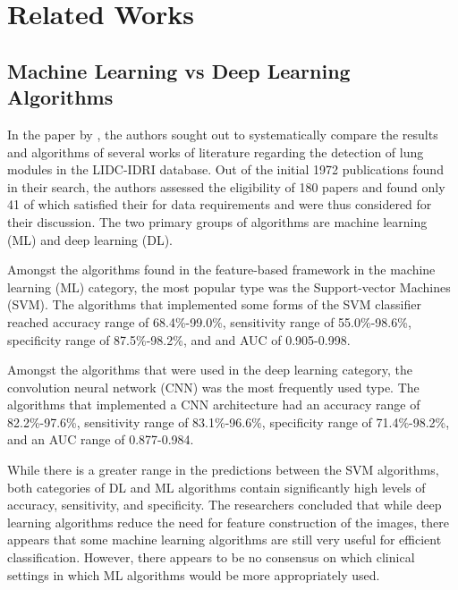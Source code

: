 \documentclass[10pt,twocolumn,letterpaper]{article}
\begin{document}

\section{Related Works} \label{sec:related}

   \subsection{Machine Learning vs Deep Learning Algorithms} \label{sec:related-dl-vs-ml}
      In the paper by \cite{ml_vs_dl}, the authors sought out to systematically compare the results and algorithms of
      several works of literature regarding the detection of lung modules in the LIDC-IDRI database.
      Out of the initial 1972 publications found in their search, the authors assessed the eligibility of 180 papers
      and found only 41 of which satisfied their for data requirements and were thus considered for their discussion.
      The two primary groups of algorithms are machine learning (ML) and deep learning (DL).

      Amongst the algorithms found in the feature-based framework in the machine learning (ML) category, the most popular
      type was the Support-vector Machines (SVM). The algorithms that implemented some forms of the SVM classifier
      reached accuracy range of 68.4\%-99.0\%, sensitivity range of 55.0\%-98.6\%, specificity range of 87.5\%-98.2\%, and
      and AUC of 0.905-0.998.

      Amongst the algorithms that were used in the deep learning category, the convolution neural network (CNN) was the most
      frequently used type. The algorithms that implemented a CNN architecture had an accuracy range of 82.2\%-97.6\%,
      sensitivity range of 83.1\%-96.6\%, specificity range of 71.4\%-98.2\%, and an AUC range of 0.877-0.984.

      While there is a greater range in the predictions between the SVM algorithms, both categories of DL and ML algorithms
      contain significantly high levels of accuracy, sensitivity, and specificity. The researchers concluded that
      while deep learning algorithms reduce the need for feature construction of the images, there appears that some
      machine learning algorithms are still very useful for efficient classification. However, there appears to be no
      consensus on which clinical settings in which ML algorithms would be more appropriately used.
\end{document}
